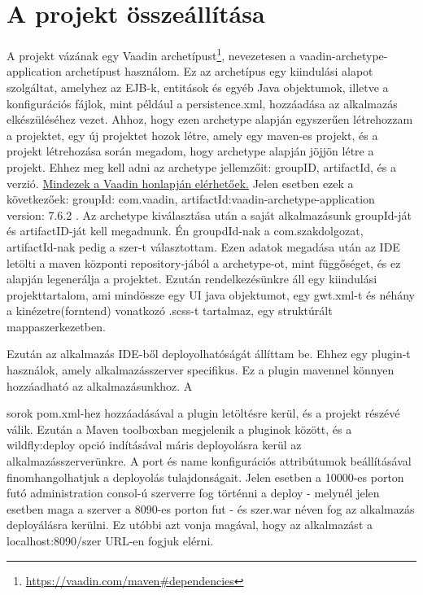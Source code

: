 \documentclass[centeredchapter]{thesis-ekf}
\theoremstyle{definition}
\theoremstyle{remark}
\begin{document}
\section{A projekt összeállítása}

A projekt vázának egy Vaadin archetípust\footnote{\url{https://vaadin.com/maven\#dependencies}}, nevezetesen a vaadin-archetype-application archetípust használom. Ez az archetípus egy kiindulási alapot szolgáltat, amelyhez az EJB-k, entitások és egyéb Java objektumok, illetve a konfigurációs fájlok, mint például a persistence.xml, hozzáadása az alkalmazás elkészüléséhez vezet.
Ahhoz, hogy ezen archetype alapján egyszerűen létrehozzam a projektet, egy új projektet hozok létre, amely egy maven-es projekt, és a projekt létrehozása során megadom, hogy archetype alapján jöjjön létre a projekt. Ehhez meg kell adni az archetype jellemzőit: groupID, artifactId, és a verzió. \href{https://vaadin.com/maven#dependencies}{Mindezek a Vaadin honlapján elérhetőek.} Jelen esetben ezek a következőek: groupId: com.vaadin, artifactId:vaadin-archetype-application version: 7.6.2 . Az archetype kiválasztása után a saját alkalmazásunk groupId-ját és artifactID-ját kell megadnunk. Én groupdId-nak a com.szakdolgozat, artifactId-nak pedig a szer-t választottam. Ezen adatok megadása után az IDE letölti a maven központi repository-jából a archetype-ot, mint függőséget, és ez alapján legenerálja a projektet. Ezután rendelkezésünkre áll egy kiindulási projekttartalom, ami mindössze egy UI java objektumot, egy gwt.xml-t és néhány a kinézetre(forntend) vonatkozó .scss-t tartalmaz, egy struktúrált mappaszerkezetben.

Ezután az alkalmazás IDE-ből deployolhatóságát állíttam be. Ehhez egy plugin-t használok, amely alkalmazásszerver specifikus. Ez a plugin mavennel könnyen hozzáadható az alkalmazásunkhoz. A 	

sorok pom.xml-hez hozzáadásával a plugin letöltésre kerül, és a projekt részévé válik. Ezután a Maven toolboxban megjelenik a pluginok között, és a wildfly:deploy opció indításával máris deployolásra kerül az alkalmazásszerverünkre. A port és name konfigurációs attribútumok beállításával finomhangolhatjuk a deployolás tulajdonságait. Jelen esetben a 10000-es porton futó administration consol-ú szerverre fog történni a deploy - melynél jelen esetben maga a szerver a 8090-es porton fut - és szer.war néven fog az alkalmazás deployálásra kerülni. Ez utóbbi azt vonja magával, hogy az alkalmazást a localhost:8090/szer URL-en fogjuk elérni. 
\end{document}
